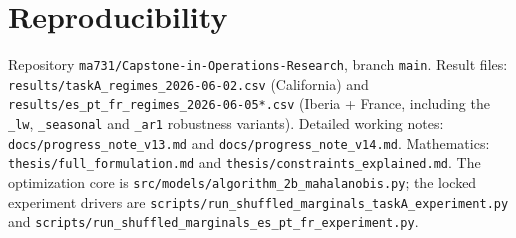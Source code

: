\documentclass[11pt]{article}
\begin{document}
\appendix
\section{Reproducibility}
Repository \texttt{ma731/Capstone-in-Operations-Research}, branch \texttt{main}. Result files:
\texttt{results/taskA\_regimes\_2026-06-02.csv} (California) and
\texttt{results/es\_pt\_fr\_regimes\_2026-06-05*.csv} (Iberia + France, including the
\texttt{\_lw}, \texttt{\_seasonal} and \texttt{\_ar1} robustness variants). Detailed working notes:
\texttt{docs/progress\_note\_v13.md} and \texttt{docs/progress\_note\_v14.md}. Mathematics:
\texttt{thesis/full\_formulation.md} and \texttt{thesis/constraints\_explained.md}. The optimization
core is \texttt{src/models/algorithm\_2b\_mahalanobis.py}; the locked experiment drivers are
\texttt{scripts/run\_shuffled\_marginals\_taskA\_experiment.py} and
\texttt{scripts/run\_shuffled\_marginals\_es\_pt\_fr\_experiment.py}.
\end{document}
